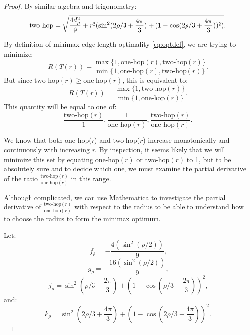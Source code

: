 \documentclass[10pt,final]{journals-1.0/asme2ej}
\begin{document}
\begin{proof}

By similar algebra and trigonometry:
\begin{equation}
  \text{two-hop}  = \sqrt{\frac{4 d_{\rho}^2}{9} +  r^2(\sin^2(2\rho/3 + \frac{4\pi}{3})  + (1 - \cos(2\rho/3 + \frac{4\pi}{3}))^2)} \text{.}\\
\end{equation}


By definition of minimax edge length optimality \cref{eq:optdef}, we are trying to minimize:
\[
R(T(r)) = \frac{\max{\{1,\text{one-hop}(r),\text{two-hop}(r)}\}}{\min{\{1,\text{one-hop}(r),\text{two-hop}(r)}\}} \text{.}
\]
But since $\text{two-hop}(r) \geq \text{one-hop}(r)$, this is equivalent to:
\[
R(T(r)) =  \frac{   \max \{1,\text{two-hop}(r)\}}
      {   \min \{1,\text{one-hop}(r)\}} \text{.}
\]
This quantity will be equal to one of:
\begin{equation}
  \frac{\text{two-hop}(r)}{1},
\frac{1}{\text{one-hop}(r)},
\frac{\text{two-hop}(r)}{\text{one-hop}(r)} \text{.}
\label{eq:ratioset}
\end{equation}

We know that both one-hop($r$) and two-hop($r$) increase monotonically and continuously with increasing $r$.
By inspection, it seems likely that we will minimize this set by equating $\text{one-hop}(r)$ or $\text{two-hop}(r)$
to 1, but to be absolutely sure and to decide which one, we must examine the partial derivative of the ratio
 $\frac{\text{two-hop}(r)}{\text{one-hop}(r)}$ in this range.

Although complicated, we can use Mathematica to investigate
the partial derivative of $\frac{\text{two-hop}(r)}{\text{one-hop}(r)}$ with respect
to the radius to be able to understand how to choose the radius to form the minimax optimum.

Let:
\begin{equation}
  f_{\rho} = -\frac{4 (\sin^2( \rho / 2))}{9} \text{,}
  \end{equation}
\begin{equation}
  g_{\rho} = -\frac{16 (\sin^2( \rho / 2))}{9} \text{,}
\end{equation}
\begin{equation}
  j_{\rho} = \sin^2(\rho/3+ \frac{2\pi}{3})  + (1 - \cos(\rho/3 + \frac{2\pi}{3}))^2 \text{,}
\end{equation}
and:
\begin{equation}
  k_{\rho} = \sin^2(2\rho/3 + \frac{4\pi}{3})  + (1 - \cos(2\rho/3 + \frac{4\pi}{3}))^2 \text{.}
\end{equation}


\end{proof}
\end{document}
